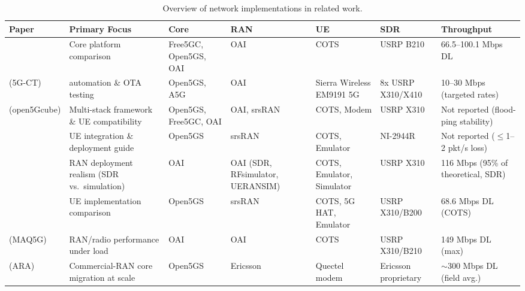 \begin{landscape}
\begin{table}[p]
\centering
\renewcommand{\arraystretch}{1.3}
\begin{tabularx}{\linewidth}{|>{\raggedright\arraybackslash}p{2.5cm}|Y|>{\raggedright\arraybackslash}p{2.6cm}|>{\raggedright\arraybackslash}p{2.5cm}|>{\raggedright\arraybackslash}p{2.6cm}|>{\raggedright\arraybackslash}p{2.6cm}|Y|}
\hline
{}
\textbf{Paper} & \textbf{Primary Focus} & \textbf{Core} & \textbf{RAN} & \textbf{UE} & \textbf{SDR} & \textbf{Throughput} \\ \hline
\cite{barbosa2025opensource} & Core platform comparison & Free5GC, Open5GS, \gls{OAI} & \gls{OAI} & \gls{COTS} & USRP B210 & 66.5--100.1 Mbps DL \\ \hline
\cite{bonati2025_5gct}\newline(5G-CT) &  automation \& \gls{OTA} testing & Open5GS, A5G & \gls{OAI} & Sierra Wireless EM9191 5G & 8x USRP X310/X410 & 10--30 Mbps (targeted rates) \\ \hline
\cite{horstmann2025open5gcube}\newline(open5Gcube) & Multi-stack framework \& \gls{UE} compatibility & Open5GS, Free5GC, \gls{OAI} & \gls{OAI}, srsRAN & \gls{COTS}, Modem & USRP X310 & Not reported (flood-ping stability) \\ \hline
\cite{mamushiane2023deploying} & \gls{UE} integration \& deployment guide & Open5GS & srsRAN & \gls{COTS}, Emulator & NI-2944R & Not reported ($\leq$1--2 pkt/s loss) \\ \hline
\cite{rouili2024evaluating} & \gls{RAN} deployment realism (\gls{SDR} vs.\ simulation) & \gls{OAI} & \gls{OAI} (\gls{SDR}, RFsimulator, UERANSIM) & \gls{COTS}, Emulator, Simulator & USRP X310 & 116 Mbps (95\% of theoretical, \gls{SDR}) \\ \hline
\cite{tio2025exploring5g} & \gls{UE} implementation comparison & Open5GS & srsRAN & \gls{COTS}, 5G HAT, Emulator & USRP X310/B200 & 68.6 Mbps DL (\gls{COTS}) \\ \hline
\cite{vazquez2024maq5g}\newline(MAQ5G) & \gls{RAN}/radio performance under load & \gls{OAI} & \gls{OAI} & \gls{COTS} & USRP X310/B210 & 149 Mbps DL (max) \\ \hline
\cite{zu2025realworld}\newline(ARA) & Commercial-\gls{RAN} core migration at scale & Open5GS & Ericsson & Quectel modem & Ericsson proprietary & $\sim$300 Mbps DL (field avg.) \\ \hline
\end{tabularx}
\caption{Overview of network implementations in related work.}
\label{tab:related_works_comparison}
\end{table}
\end{landscape}
